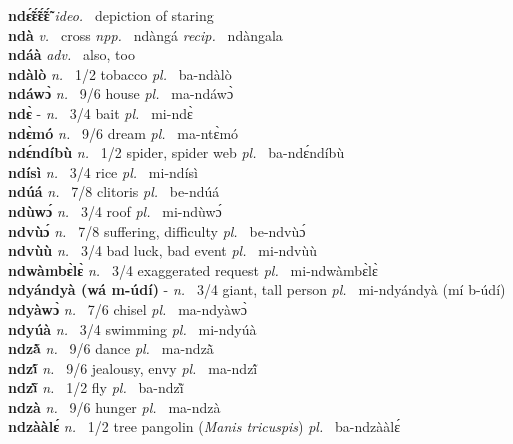 \noindent
{\bfseries ndɛ̃́ɛ̃́ɛ̃́ɛ̃́}  {\itshape ideo.~} depiction of staring    \\ 
{\bfseries ndà}  {\itshape v.~} cross   {\itshape npp.~} ndàngá {\itshape recip.~} ndàngala  \\ 
{\bfseries ndáà}  {\itshape adv.~} also, too    \\ 
{\bfseries ndàlò}  {\itshape n.~} 1/2 tobacco {\itshape pl.~} ba-ndàlò    \\ 
{\bfseries ndáwɔ̀}  {\itshape n.~} 9/6 house {\itshape pl.~} ma-ndáwɔ̀    \\ 
{\bfseries ndɛ̀} - {\itshape n.~} 3/4 bait {\itshape pl.~} mi-ndɛ̀    \\ 
{\bfseries ndɛ̀mó}  {\itshape n.~} 9/6 dream {\itshape pl.~} ma-ntɛ̀mó    \\ 
{\bfseries ndɛ́ndíbù}  {\itshape n.~} 1/2 spider, spider web {\itshape pl.~} ba-ndɛ́ndíbù    \\ 
{\bfseries ndísì}  {\itshape n.~} 3/4 rice {\itshape pl.~} mi-ndísì    \\ 
{\bfseries ndúá}  {\itshape n.~} 7/8 clitoris {\itshape pl.~} be-ndúá    \\ 
{\bfseries ndùwɔ́}  {\itshape n.~} 3/4 roof {\itshape pl.~} mi-ndùwɔ́    \\ 
{\bfseries ndvùɔ́}  {\itshape n.~} 7/8 suffering, difficulty {\itshape pl.~} be-ndvùɔ́    \\ 
{\bfseries ndvùù}  {\itshape n.~} 3/4 bad luck, bad event {\itshape pl.~} mi-ndvùù    \\ 
{\bfseries ndwàmbɛ̀lɛ̀}  {\itshape n.~} 3/4 exaggerated request {\itshape pl.~} mi-ndwàmbɛ̀lɛ̀    \\ 
{\bfseries ndyándyà (wá m-údí)} - {\itshape n.~} 3/4 giant, tall person {\itshape pl.~} mi-ndyándyà (mí b-údí)    \\ 
{\bfseries ndyàwɔ̀}  {\itshape n.~} 7/6 chisel {\itshape pl.~} ma-ndyàwɔ̀    \\ 
{\bfseries ndyúà}  {\itshape n.~} 3/4 swimming {\itshape pl.~} mi-ndyúà    \\ 
{\bfseries ndzã̀}  {\itshape n.~} 9/6 dance {\itshape pl.~} ma-ndzã̀    \\ 
{\bfseries ndzĩ́}  {\itshape n.~} 9/6 jealousy, envy {\itshape pl.~} ma-ndzĩ́    \\ 
{\bfseries ndzĩ̀}  {\itshape n.~} 1/2 fly {\itshape pl.~} ba-ndzĩ̀    \\ 
{\bfseries ndzà}  {\itshape n.~} 9/6 hunger {\itshape pl.~} ma-ndzà    \\ 
{\bfseries ndzààlɛ́}  {\itshape n.~} 1/2 tree pangolin ({\itshape Manis tricuspis}) {\itshape pl.~} ba-ndzààlɛ́    \\ 
